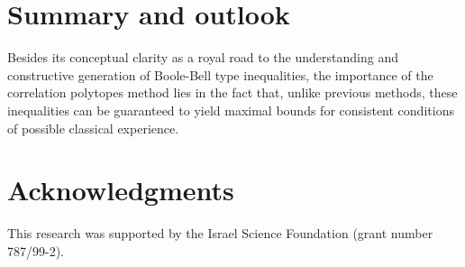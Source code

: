 \section{Summary and outlook}
Besides its conceptual clarity as a royal road  to the understanding
and constructive generation of Boole-Bell type inequalities,
the importance of the
correlation polytopes
method lies in the fact that,
unlike previous methods,
these inequalities can be guaranteed to yield maximal bounds for consistent
conditions of possible classical experience.

\section{Acknowledgments}
This research was supported by the Israel Science Foundation (grant number
787/99-2).


%
%
%
%


